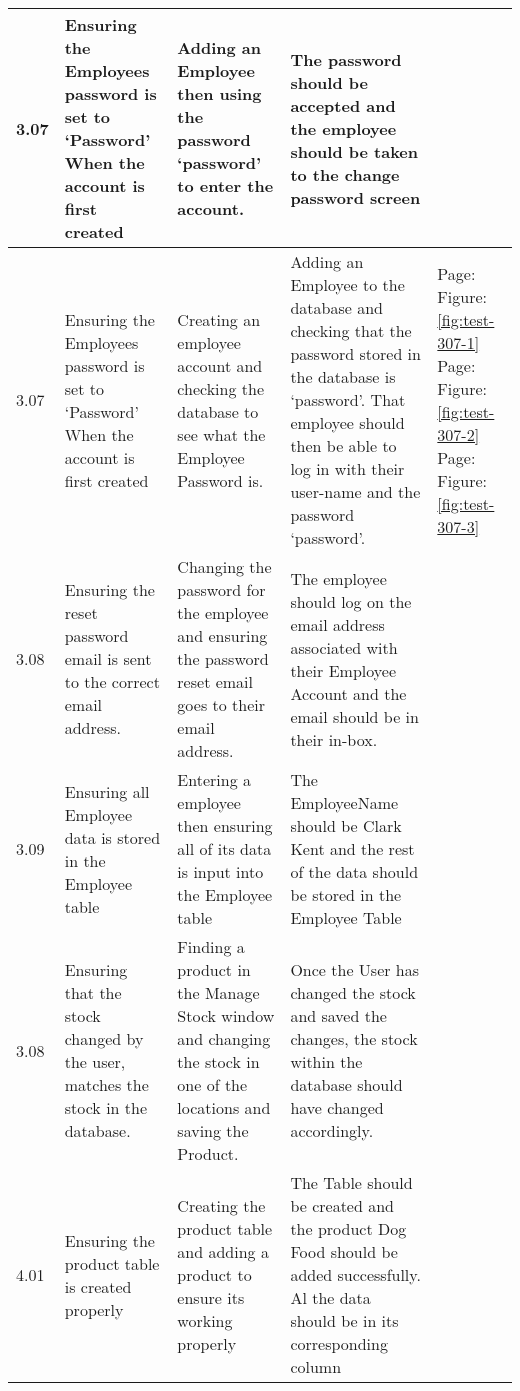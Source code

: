 \begin{flushleft}
\begin{longtable}{|p{1cm}|p{2.5cm}|p{2.5cm}|p{2cm}|p{2cm}|}
	\rowcolor{dark-grey}3.07 & Ensuring the Employees password is set to `Password' When the account is first created & Adding an Employee then using the password `password' to enter the account. & The password should be accepted and the employee should be taken to the change password screen& \\ \hline
	\rowcolor{light-grey}3.07 & Ensuring the Employees password is set to `Password' When the account is first created & Creating an employee account and checking the database to see what the Employee Password is. & Adding an Employee to the database and checking that the password stored in the database is `password'. That employee should then be able to log in with their user-name and the password `password'. & Page: \pageref{fig:test-307-1} \newline Figure: \ref{fig:test-307-1} \newline \newline Page: \pageref{fig:test-307-2} \newline Figure: \ref{fig:test-307-2} \newline \newline  Page: \pageref{fig:test-307-3} \newline Figure: \ref{fig:test-307-3}\\ \hline
	\rowcolor{dark-grey}3.08 & Ensuring the reset password email is sent to the correct email address. & Changing the password for the employee and ensuring the password reset email goes to their email address. & The employee should log on the email address associated with their Employee Account and the email should be in their in-box.& \\ \hline
	\rowcolor{dark-grey}3.09 & Ensuring all Employee data is stored in the Employee table & Entering a employee then ensuring all of its data is input into the Employee table & The EmployeeName should be Clark Kent and the rest of the data should be stored in the Employee Table & \\ \hline
	\rowcolor{light-grey}3.08 & Ensuring that the stock changed by the user, matches the stock in the database. & Finding a product in the Manage Stock window and changing the stock in one of the locations and saving the Product. & Once the User has changed the stock and saved the changes, the stock within the database should have changed accordingly. &  \\ \hline
	\rowcolor{dark-grey}4.01 & Ensuring the product table is created properly & Creating the product table and adding a product to ensure its working properly & The Table should be created and the product Dog Food should be added successfully. Al the data should be in its corresponding column & \\ \hline

\end{longtable}
\end{flushleft}
